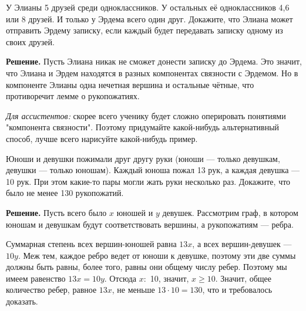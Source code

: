 У Элианы 5 друзей среди одноклассников. У остальных её одноклассников 4,6 или 8 друзей. И только у Эрдема всего один друг. Докажите, что Элиана может отправить Эрдему записку, если каждый будет передавать записку одному из своих друзей.

\textbf{Решение.} Пусть Элиана никак не сможет донести записку до Эрдема. Это значит, что Элиана и Эрдем находятся в разных компонентах связности с Эрдемом. Но в компоненте Элианы одна нечетная вершина и остальные чётные, что противоречит лемме о рукопожатиях.

\textit{Для ассистентов:} скорее всего ученику будет сложно оперировать понятиями "компонента связности". Поэтому придумайте какой-нибудь альтернативный способ, лучше всего нарисуйте какой-нибудь пример.

Юноши и девушки пожимали друг другу руки (юноши — только девушкам, девушки — только юношам). Каждый юноша пожал 13 рук, а каждая девушка — 10 рук. При этом какие-то пары могли жать руки несколько раз. Докажите, что было не менее 130 рукопожатий.

\textbf{Решение.}
Пусть всего было $x$ юношей и $y$ девушек. Рассмотрим граф, в котором юношам и девушкам будут соответствовать вершины, а рукопожатиям — ребра.

Суммарная степень всех вершин-юношей равна $13 x$, а всех вершин-девушек — $10 y$. Меж тем, каждое ребро ведет от юноши к девушке, поэтому эти две суммы должны быть равны, более того, равны они общему числу ребер. Поэтому мы имеем равенство $13 x=10 y$. Отсюда $x:$ 10, значит, $x \geqslant 10$. Значит, общее количество ребер, равное $13 x$, не меньше $13 \cdot 10=130$, что и требовалось доказать.

